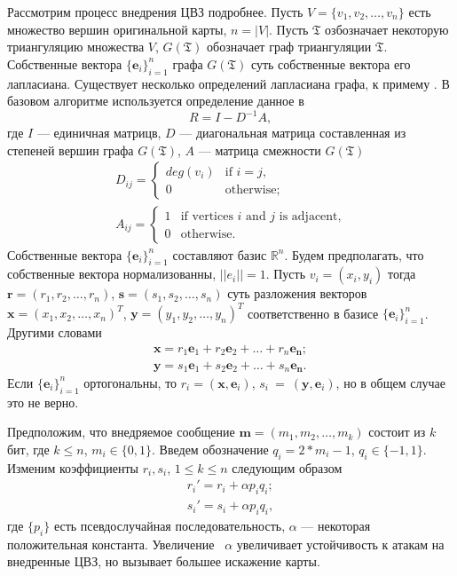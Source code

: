 Рассмотрим процесс внедрения ЦВЗ подробнее.  
Пусть $V = \{v_1, v_2, \dots, v_n\}$ есть множество вершин оригинальной карты, $n = |V|$. 
Пусть $\mathfrak{T}$ озбозначает некоторую триангуляцию множества $V$, $G(\mathfrak{T})$ обозначает 
граф триангуляции $\mathfrak{T}$. Собственные вектора $\{\mathbf{e}_i\}_{i=1}^n$ графа $G(\mathfrak{T})$ суть 
собственные вектора его лапласиана. 
Существует несколько определений лапласиана графа, к примему \cite{Biggs, Chung, Zhang}. В базовом алгоритме 
используется определение данное в \cite{Biggs}
$$R = I - D^{-1} A,$$ где $I$ --- единичная матрицв, $D$ --- диагональная матрица составленная из 
степеней вершин графа $G(\mathfrak{T})$, $A$ --- матрица смежности $G(\mathfrak{T})$
\begin{eqnarray*}
  D_{ij} = \begin{cases} deg(v_i) &\text{if $i = j$,} \\ 0 &\text{otherwise;} \end{cases} \\
  A_{ij} = \begin{cases} 1 &\text{if vertices $i$ and $j$ is adjacent,} \\ 0 &\text{otherwise.} \end{cases} 
\end{eqnarray*}
Собственные вектора $\{\mathbf{e}_i\}_{i=1}^n$ составляют базис $\mathbb{R}^n$. Будем предполагать, что 
собственные вектора нормализованны, $||e_i|| = 1$. 
Пусть $v_i = (x_i, y_i)$ тогда $\mathbf{r} = (r_1, r_2, \dots, r_n)$, $\mathbf{s} = (s_1, s_2, \dots, s_n)$ 
суть разложения векторов $\mathbf{x} = (x_1, x_2, \dots, x_n)^T$, $\mathbf{y} = (y_1, y_2, \dots, y_n)^T$ 
соответственно в базисе $\{\mathbf{e}_i\}_{i=1}^n$. Другими словами 
\begin{eqnarray*}
  \mathbf{x} = r_1 \mathbf{e}_1 + r_2 \mathbf{e}_2 + \dots + r_n \mathbf{e_n}; \\ 
  \mathbf{y} = s_1 \mathbf{e}_1 + s_2 \mathbf{e}_2 + \dots + s_n \mathbf{e_n}.  
\end{eqnarray*}
Если $\{\mathbf{e}_i\}_{i=1}^n$ ортогональны, то $r_i = (\mathbf{x}, \mathbf{e}_i)$, 
$s_i~=~(\mathbf{y}, \mathbf{e}_i)$, но в общем случае это не верно. 

Предположим, что внедряемое сообщение $\mathbf{m} = (m_1, m_2, \dots, m_k)$ состоит из $k$ бит, где $k \le n$, 
$m_i \in \{0, 1\}$. Введем обозначение $q_i = 2 * m_i - 1$, $q_i \in \{-1, 1\}$.
Изменим коэффициенты $r_i, s_i$, $1 \le k \le n$ следующим образом
\begin{eqnarray*}
  r_i' = r_i + \alpha p_i q_i; \\
  s_i' = s_i + \alpha p_i q_i, 
\end{eqnarray*}
где $\{p_i\}$ есть псевдослучайная последовательность, $\alpha$ --- некоторая положительная константа. 
Увеличение ~$\alpha$ увеличивает устойчивость к атакам на внедренные ЦВЗ, но вызывает большее искажение
карты. 

